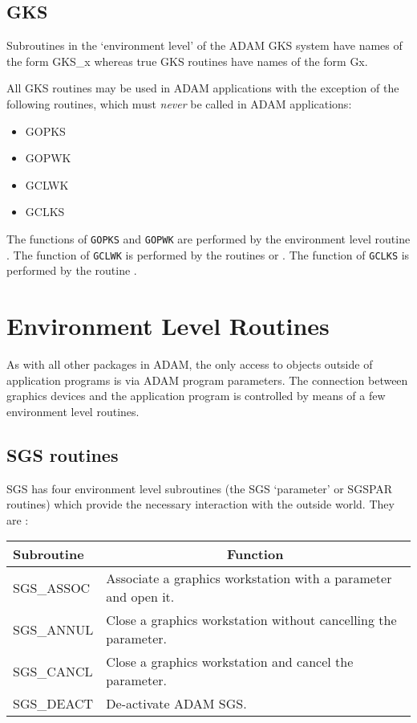 \subsection{GKS}

Subroutines in the `environment level' of the ADAM GKS system have names of
the form GKS\_x whereas true GKS routines have names of the form Gx.

All GKS routines may be used in ADAM applications with the exception of the
following routines, which must {\em never} be called in ADAM applications:

\begin{itemize}
\item GOPKS
\item GOPWK
\item GCLWK
\item GCLKS
\end{itemize}

The functions of {\tt GOPKS} and {\tt GOPWK} are performed by the environment 
level routine . The function of 
{\tt GCLWK} is performed by the routines 
 or 
. The function of {\tt GCLKS} 
is performed by the routine .

\section{Environment Level Routines}

As with all other packages in ADAM, the only access to objects outside of
application programs is via ADAM program parameters. The connection between
graphics devices and the application program is controlled by means of a few
environment level routines.

\subsection{SGS routines}

SGS has four environment level subroutines (the SGS `parameter' or SGSPAR 
routines) which provide the necessary interaction with the outside world.
They are :

\begin{center}
\begin{tabular}{||l|l||} \hline
Subroutine & \multicolumn{1}{c||}{Function} \\ \hline
SGS\_ASSOC  & Associate a graphics workstation with a parameter and open it.\\
SGS\_ANNUL  & Close a graphics workstation without cancelling the parameter.\\
SGS\_CANCL  & Close a graphics workstation and cancel the parameter.\\
SGS\_DEACT  & De-activate ADAM SGS.\\ \hline
\end{tabular}
\end{center}

